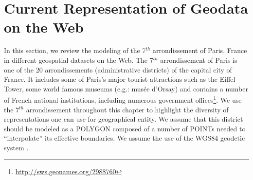 \section{Current Representation of Geodata on the Web}\label{sec:scenario}
In this section, we review the modeling of the 7$^{th}$ arrondissement of Paris, France in different geospatial datasets on the Web. The 7$^{th}$ arrondissement of Paris is one of the 20 arrondissements (administrative districts) of the capital city of France. It includes some of Paris's major tourist attractions such as the Eiffel Tower, some world famous museums (e.g.: mus\'{e}e d'Orsay) and contains a number of French national institutions, including numerous government offices\footnote{\url{http://sws.geonames.org/2988760}}. We use the 7$^{th}$ arrondissement throughout this chapter to highlight the diversity of representations one can use for  geographical entity. We assume that this district should be modeled as a POLYGON composed of a number of POINTs needed to ``interpolate'' its effective boundaries. We assume the use of the WGS84 geodetic system \cite{wgs84ref}.

\begin{table}[!htbp]
\end{table}

